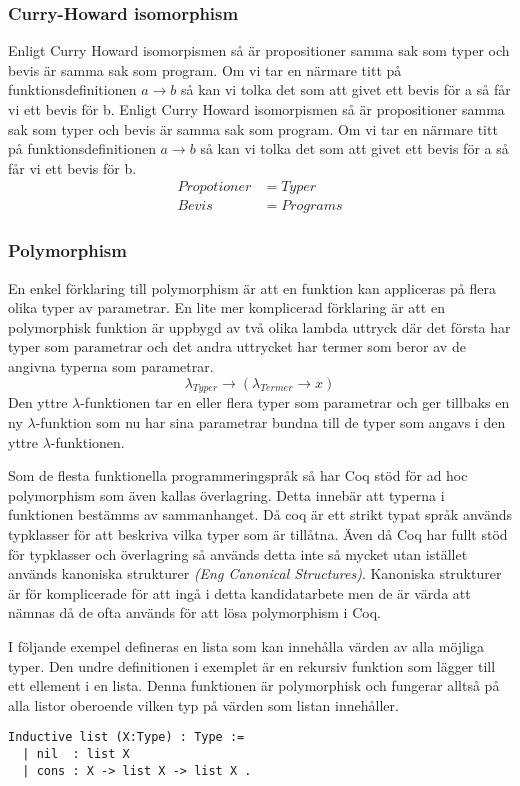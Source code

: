 \begin{itemize}
\subsubsection{Curry-Howard isomorphism}
Enligt Curry Howard isomorpismen så är propositioner samma sak som typer och
bevis är samma sak som program. Om vi tar en närmare titt på
funktionsdefinitionen $a \rightarrow b$ så kan vi tolka det som att givet ett
bevis för a så får vi ett bevis för b.
Enligt Curry Howard isomorpismen så är propositioner samma sak som typer och
bevis är samma sak som program. Om vi tar en närmare titt på
funktionsdefinitionen $a \rightarrow b$ så kan vi tolka det som att givet ett
bevis för a så får vi ett bevis för b.
\begin{align*}
Propotioner &= Typer \\
Bevis &= Programs
\end{align*}

\subsubsection{Polymorphism}
En enkel förklaring till polymorphism är att en funktion kan appliceras på
flera olika typer av parametrar.
En lite mer komplicerad förklaring är att en polymorphisk funktion är uppbygd av
två olika lambda uttryck där det första har typer som parametrar och det andra
uttrycket har termer som beror av de angivna typerna som parametrar.
\begin{equation}
  \lambda_{Typer} \rightarrow (\lambda_{Termer} \rightarrow x)
  \label{polymorphsk funktion}
\end{equation}
Den yttre $\lambda$-funktionen tar en eller flera typer som parametrar och ger
tillbaks en ny $\lambda$-funktion som nu har sina parametrar bundna till de
typer som angavs i den yttre $\lambda$-funktionen.

Som de flesta funktionella programmeringspråk så har Coq stöd för ad hoc
polymorphism som även kallas överlagring. Detta innebär att typerna i
funktionen bestämms av sammanhanget. Då coq är ett strikt typat språk används
typklasser för att beskriva vilka typer som är tillåtna.
Även då Coq har fullt stöd för typklasser och överlagring så används detta inte
så mycket utan istället används kanoniska strukturer {\it (Eng Canonical
Structures)}. Kanoniska strukturer är för komplicerade för att ingå i detta
kandidatarbete men de är värda att nämnas då de ofta används för att lösa
polymorphism i Coq.

I följande exempel defineras en lista som kan innehålla värden av alla möjliga
typer. Den undre definitionen i exemplet är en rekursiv funktion som lägger till
ett ellement i en lista. Denna funktionen är polymorphisk och fungerar alltså på
alla listor oberoende vilken typ på värden som listan innehåller.
\begin{verbatim}
Inductive list (X:Type) : Type :=
  | nil  : list X
  | cons : X -> list X -> list X .


\end{verbatim}
\end{itemize}
